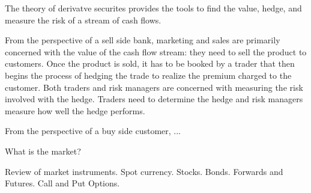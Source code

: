 The theory of derivatve securites provides the tools to find the value,
hedge, and measure the risk of a stream of cash flows.

From the perspective of a sell side bank, marketing and sales are
primarily concerned with the value of the cash flow stream: they need to
sell the product to customers.  Once the product is sold, it has to be
booked by a trader that then begins the process of hedging the trade to
realize the premium charged to the customer. Both traders and risk
managers are concerned with measuring the risk involved with the hedge.
Traders need to determine the hedge and risk managers measure how
well the hedge performs.

From the perspective of a buy side customer, ...

What is the market?

Review of market instruments.
Spot currency.
Stocks.
Bonds.
Forwards and Futures.
Call and Put Options.
